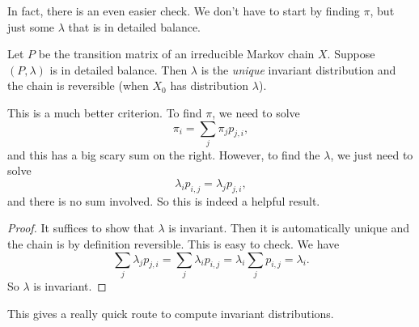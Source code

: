 \documentclass[a4paper]{article}
\begin{document}
In fact, there is an even easier check. We don't have to start by finding $\pi$, but just some $\lambda$ that is in detailed balance.

\begin{prop}
  Let $P$ be the transition matrix of an irreducible Markov chain $X$. Suppose $(P, \lambda)$ is in detailed balance. Then $\lambda$ is the \emph{unique} invariant distribution and the chain is reversible (when $X_0$ has distribution $\lambda$).
\end{prop}

This is a much better criterion. To find $\pi$, we need to solve
\[
  \pi_i = \sum_j \pi_j p_{j, i},
\]
and this has a big scary sum on the right. However, to find the $\lambda$, we just need to solve
\[
  \lambda_i p_{i, j} = \lambda_j p_{j, i},
\]
and there is no sum involved. So this is indeed a helpful result.

\begin{proof}
  It suffices to show that $\lambda$ is invariant. Then it is automatically unique and the chain is by definition reversible. This is easy to check. We have
  \[
    \sum_j \lambda_j p_{j, i} = \sum_j \lambda_i p_{i, j} = \lambda_i \sum_j p_{i, j} = \lambda_i.
  \]
  So $\lambda$ is invariant.
\end{proof}
This gives a really quick route to compute invariant distributions.
\end{document}
